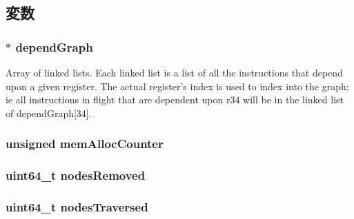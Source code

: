 \subsection{変数}
\hypertarget{classDependencyGraph_a6f79afe06f613dc0de42e79175c6e776}{
\subsubsection[{dependGraph}]{$\ast$ {\bf dependGraph}}}
\label{classDependencyGraph_a6f79afe06f613dc0de42e79175c6e776}
Array of linked lists. Each linked list is a list of all the instructions that depend upon a given register. The actual register's index is used to index into the graph; ie all instructions in flight that are dependent upon r34 will be in the linked list of dependGraph\mbox{[}34\mbox{]}. \hypertarget{classDependencyGraph_a3cfe22df7cc4db63a7704ae43ef789aa}{
\subsubsection[{memAllocCounter}]{\setlength{\rightskip}{0pt plus 5cm}unsigned {\bf memAllocCounter}}}
\label{classDependencyGraph_a3cfe22df7cc4db63a7704ae43ef789aa}
\hypertarget{classDependencyGraph_ad997769c2f059584b9ffb4a2e118207b}{
\subsubsection[{nodesRemoved}]{\setlength{\rightskip}{0pt plus 5cm}uint64\_\-t {\bf nodesRemoved}}}
\label{classDependencyGraph_ad997769c2f059584b9ffb4a2e118207b}
\hypertarget{classDependencyGraph_a3872e5bf089b4615d62a04b097795a6e}{
\subsubsection[{nodesTraversed}]{\setlength{\rightskip}{0pt plus 5cm}uint64\_\-t {\bf nodesTraversed}}}
